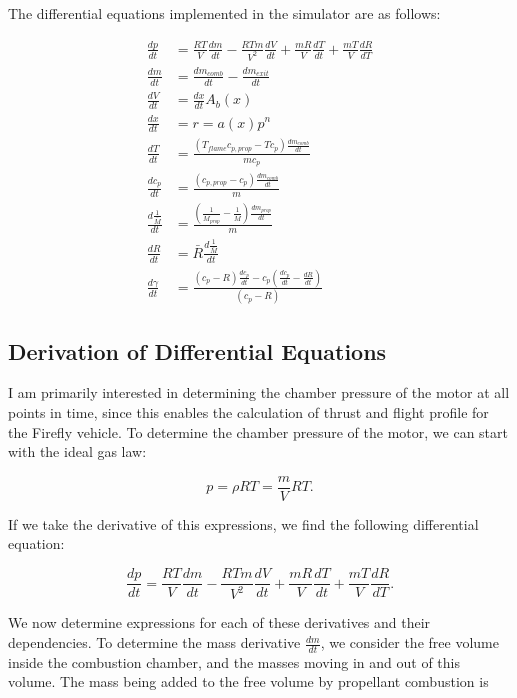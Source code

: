 \documentclass[12pt, letterpaper]{article}
\begin{document}
The differential equations implemented in the simulator are as follows:

\begin{align*}
  \frac{dp}{dt} & = \frac{R T}{V} \frac{dm}{dt} - \frac{R T m}{V^2} \frac{dV}{dt} + \frac{m R}{V} \frac{dT}{dt} + \frac{m T}{V}\frac{dR}{dT} \\
  \frac{dm}{dt} &= \frac{dm_{comb}}{dt} - \frac{dm_{exit}}{dt} \\
  \frac{dV}{dt} &= \frac{dx}{dt} A_b(x) \\
  \frac{dx}{dt} &= r = a(x) p^n \\
  \frac{dT}{dt} &= \frac{\left( T_{flame} c_{p, prop} - T c_p \right) \frac{dm_{comb}}{dt}}{m c_p} \\
   \frac{d c_p}{dt} &= \frac{\left( c_{p, prop} - c_p \right) \frac{dm_{comb}}{dt}}{m} \\
    \frac{d \frac{1}{\bar{M}}}{dt} &= \frac{ \left( \frac{1}{\bar{M_{prop}}} - \frac{1}{\bar{M}}\right) \frac{dm_{prop}}{dt}}{m} \\
    \frac{dR}{dt} &= \bar{R} \frac{d \frac{1}{\bar{M}}}{dt} \\
    \frac{d \gamma}{dt} &= \frac{ \left( c_p - R \right) \frac{d c_p}{dt} - c_p \left( \frac{d c_p}{dt} - \frac{dR}{dt} \right)}{\left( c_p - R \right)}
\end{align*}

\subsection{Derivation of Differential Equations}

I am primarily interested in determining the chamber pressure of the motor at all points in time, since this enables the calculation of thrust and flight profile for the Firefly vehicle. To determine the chamber pressure of the motor, we can start with the ideal gas law:

\begin{equation}
  p = \rho R T = \frac{m}{V} R T .
\end{equation}

If we take the derivative of this expressions, we find the following differential equation:

\begin{equation}
  \frac{dp}{dt} = \frac{R T}{V} \frac{dm}{dt} - \frac{R T m}{V^2} \frac{dV}{dt} + \frac{m R}{V} \frac{dT}{dt} + \frac{m T}{V}\frac{dR}{dT} .
\end{equation}

We now determine expressions for each of these derivatives and their dependencies. To determine the mass derivative $\frac{dm}{dt}$, we consider the free volume inside the combustion chamber, and the masses moving in and out of this volume. The mass being added to the free volume by propellant combustion is
\end{document}
